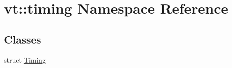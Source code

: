 \hypertarget{namespacevt_1_1timing}{}\section{vt\+:\+:timing Namespace Reference}
\label{namespacevt_1_1timing}
\subsection*{Classes}
\begin{DoxyCompactItemize}
\item 
struct \hyperlink{structvt_1_1timing_1_1_timing}{Timing}
\end{DoxyCompactItemize}
